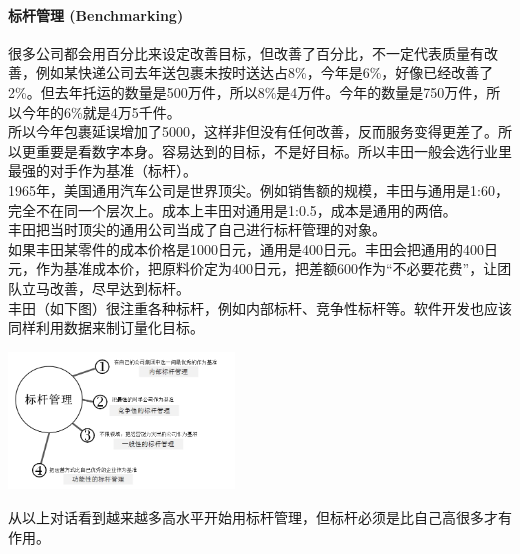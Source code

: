 \hypertarget{ux6807ux6746ux7ba1ux7406-benchmarking}{%
\paragraph{标杆管理
(Benchmarking)}\label{ux6807ux6746ux7ba1ux7406-benchmarking}}

很多公司都会用百分比来设定改善目标，但改善了百分比，不一定代表质量有改善，例如某快递公司去年送包裹未按时送达占8\%，今年是6\%，好像已经改善了2\%。但去年托运的数量是500万件，所以8\%是4万件。今年的数量是750万件，所以今年的6\%就是4万5千件。\\
所以今年包裹延误增加了5000，这样非但没有任何改善，反而服务变得更差了。所以更重要是看数字本身。容易达到的目标，不是好目标。所以丰田一般会选行业里最强的对手作为基准（标杆）。\\
1965年，美国通用汽车公司是世界顶尖。例如销售额的规模，丰田与通用是1:60，完全不在同一个层次上。成本上丰田对通用是1:0.5，成本是通用的两倍。\\
丰田把当时顶尖的通用公司当成了自己进行标杆管理的对象。\\
如果丰田某零件的成本价格是1000日元，通用是400日元。丰田会把通用的400日元，作为基准成本价，把原料价定为400日元，把差额600作为``不必要花费''，让团队立马改善，尽早达到标杆。\\
丰田（如下图）很注重各种标杆，例如内部标杆、竞争性标杆等。软件开发也应该同样利用数据来制订量化目标。


\includegraphics[width=6cm]{丰田p1.jpg}


从以上对话看到越来越多高水平开始用标杆管理，但标杆必须是比自己高很多才有作用。

